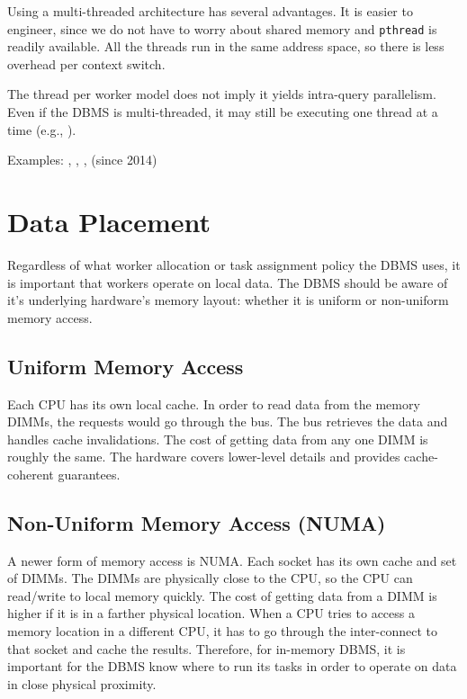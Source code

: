 \documentclass[11pt]{article}
\begin{document}
Using a multi-threaded architecture has several advantages. It is easier to engineer, since we do 
not have to worry about shared memory and \texttt{pthread} is readily available. All the threads run 
in the same address space, so there is less overhead per context switch.


The thread per worker model does not imply it yields intra-query parallelism. Even if the DBMS is 
multi-threaded, it may still be executing one thread at a time (e.g., ).

Examples: , , ,  (since 2014)


\section{Data Placement}
Regardless of what worker allocation or task assignment policy the DBMS uses, it is important that 
workers operate on local data. The DBMS should be aware of it's underlying hardware's memory layout: 
whether it is uniform or non-uniform memory access.

\subsection*{Uniform Memory Access}
Each CPU has its own local cache. In order to read data from the memory DIMMs, the requests would go 
through the bus. The bus retrieves the data and handles cache invalidations. The cost of getting 
data from any one DIMM is roughly the same. The hardware covers lower-level details and provides 
cache-coherent guarantees.

\subsection*{Non-Uniform Memory Access (NUMA)}
A newer form of memory access is NUMA. Each socket has its own cache and set of DIMMs. The DIMMs are 
physically close to the CPU, so the CPU can read/write to local memory quickly. The cost of getting 
data from a DIMM is higher if it is in a farther physical location. When a CPU tries to access a 
memory location in a different CPU, it has to go through the inter-connect to that socket and cache 
the results. Therefore, for in-memory DBMS, it is important for the DBMS know where to run its tasks 
in order to operate on data in close physical proximity.
\end{document}
